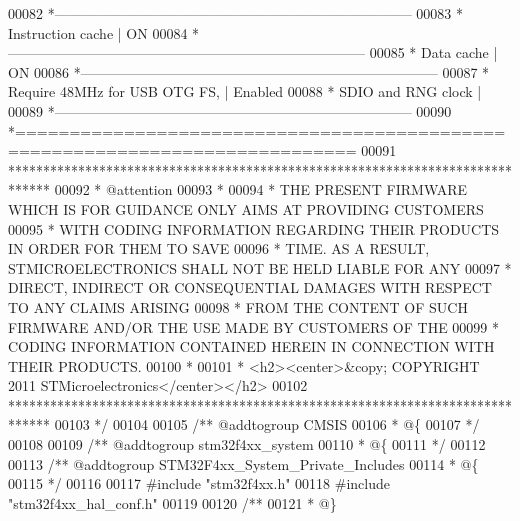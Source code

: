 \begin{DoxyCode}
00082 \textcolor{comment}{  *-----------------------------------------------------------------------------}
00083 \textcolor{comment}{  *        Instruction cache                      | ON}
00084 \textcolor{comment}{  *-----------------------------------------------------------------------------}
00085 \textcolor{comment}{  *        Data cache                             | ON}
00086 \textcolor{comment}{  *-----------------------------------------------------------------------------}
00087 \textcolor{comment}{  *        Require 48MHz for USB OTG FS,          | Enabled}
00088 \textcolor{comment}{  *        SDIO and RNG clock                     |}
00089 \textcolor{comment}{  *-----------------------------------------------------------------------------}
00090 \textcolor{comment}{  *=============================================================================}
00091 \textcolor{comment}{  ****************************************************************************** }
00092 \textcolor{comment}{  * @attention}
00093 \textcolor{comment}{  *}
00094 \textcolor{comment}{  * THE PRESENT FIRMWARE WHICH IS FOR GUIDANCE ONLY AIMS AT PROVIDING CUSTOMERS}
00095 \textcolor{comment}{  * WITH CODING INFORMATION REGARDING THEIR PRODUCTS IN ORDER FOR THEM TO SAVE}
00096 \textcolor{comment}{  * TIME. AS A RESULT, STMICROELECTRONICS SHALL NOT BE HELD LIABLE FOR ANY}
00097 \textcolor{comment}{  * DIRECT, INDIRECT OR CONSEQUENTIAL DAMAGES WITH RESPECT TO ANY CLAIMS ARISING}
00098 \textcolor{comment}{  * FROM THE CONTENT OF SUCH FIRMWARE AND/OR THE USE MADE BY CUSTOMERS OF THE}
00099 \textcolor{comment}{  * CODING INFORMATION CONTAINED HEREIN IN CONNECTION WITH THEIR PRODUCTS.}
00100 \textcolor{comment}{  *}
00101 \textcolor{comment}{  * <h2><center>&copy; COPYRIGHT 2011 STMicroelectronics</center></h2>}
00102 \textcolor{comment}{  ******************************************************************************}
00103 \textcolor{comment}{  */}
00104 
00105 \textcolor{comment}{/** @addtogroup CMSIS}
00106 \textcolor{comment}{  * @\{}
00107 \textcolor{comment}{  */}
00108 
00109 \textcolor{comment}{/** @addtogroup stm32f4xx\_system}
00110 \textcolor{comment}{  * @\{}
00111 \textcolor{comment}{  */}
00112 
00113 \textcolor{comment}{/** @addtogroup STM32F4xx\_System\_Private\_Includes}
00114 \textcolor{comment}{  * @\{}
00115 \textcolor{comment}{  */}
00116 
00117 \textcolor{preprocessor}{#}\textcolor{preprocessor}{include} "stm32f4xx.h"
00118 \textcolor{preprocessor}{#}\textcolor{preprocessor}{include} "stm32f4xx_hal_conf.h"
00119 
00120 \textcolor{comment}{/**}
00121 \textcolor{comment}{  * @\}}

\end{DoxyCode}
